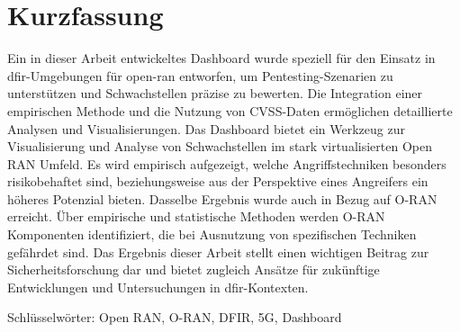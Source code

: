 \chapter*{Kurzfassung}
\label{chap:kurzfassung}
Ein in dieser Arbeit entwickeltes Dashboard wurde speziell für den Einsatz in \gls{dfir}-Umgebungen für \gls{open-ran} entworfen, um Pentesting-Szenarien zu unterstützen und Schwachstellen präzise zu bewerten. Die Integration einer empirischen Methode und die Nutzung von CVSS-Daten ermöglichen detaillierte Analysen und Visualisierungen. Das Dashboard bietet ein Werkzeug zur Visualisierung und Analyse von Schwachstellen im stark virtualisierten Open RAN Umfeld. Es wird empirisch aufgezeigt, welche Angriffstechniken besonders risikobehaftet sind, beziehungsweise aus der Perspektive eines Angreifers ein höheres Potenzial bieten. Dasselbe Ergebnis wurde auch in Bezug auf O-RAN erreicht. Über empirische und statistische Methoden werden O-RAN Komponenten identifiziert, die bei Ausnutzung von spezifischen Techniken gefährdet sind. Das Ergebnis dieser Arbeit stellt einen wichtigen Beitrag zur Sicherheitsforschung dar und bietet zugleich Ansätze für zukünftige Entwicklungen und Untersuchungen in \gls{dfir}-Kontexten.
\par Schlüsselwörter: Open RAN, O-RAN, DFIR, 5G, Dashboard

